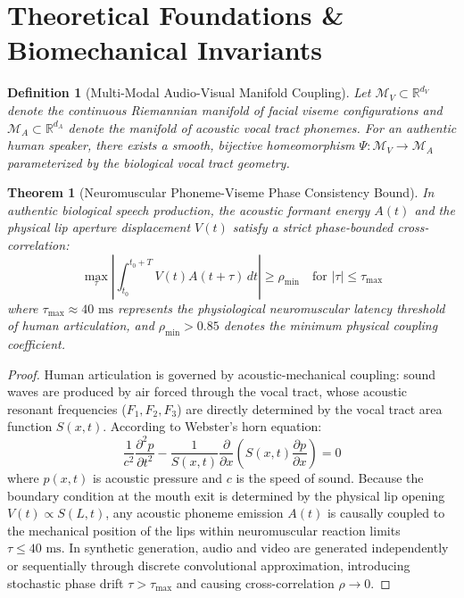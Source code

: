 \documentclass[journal]{IEEEtran}
\newtheorem{theorem}{Theorem}
\newtheorem{definition}{Definition}
\begin{document}
\section{Theoretical Foundations \& Biomechanical Invariants}

\begin{definition}[Multi-Modal Audio-Visual Manifold Coupling]
Let $\mathcal{M}_V \subset \mathbb{R}^{d_V}$ denote the continuous Riemannian manifold of facial viseme configurations and $\mathcal{M}_A \subset \mathbb{R}^{d_A}$ denote the manifold of acoustic vocal tract phonemes. For an authentic human speaker, there exists a smooth, bijective homeomorphism $\Psi: \mathcal{M}_V \to \mathcal{M}_A$ parameterized by the biological vocal tract geometry.
\end{definition}

\begin{theorem}[Neuromuscular Phoneme-Viseme Phase Consistency Bound]
In authentic biological speech production, the acoustic formant energy $A(t)$ and the physical lip aperture displacement $V(t)$ satisfy a strict phase-bounded cross-correlation:
\begin{equation}
\max_{\tau} \left| \int_{t_0}^{t_0 + T} V(t) A(t + \tau) \, dt \right| \ge \rho_{\min} \quad \text{for } |\tau| \le \tau_{\max}
\end{equation}
where $\tau_{\max} \approx 40\text{ ms}$ represents the physiological neuromuscular latency threshold of human articulation, and $\rho_{\min} > 0.85$ denotes the minimum physical coupling coefficient.
\end{theorem}

\begin{proof}
Human articulation is governed by acoustic-mechanical coupling: sound waves are produced by air forced through the vocal tract, whose acoustic resonant frequencies ($F_1, F_2, F_3$) are directly determined by the vocal tract area function $S(x, t)$. According to Webster's horn equation:
\begin{equation}
\frac{1}{c^2} \frac{\partial^2 p}{\partial t^2} - \frac{1}{S(x, t)} \frac{\partial}{\partial x} \left( S(x, t) \frac{\partial p}{\partial x} \right) = 0
\end{equation}
where $p(x, t)$ is acoustic pressure and $c$ is the speed of sound. Because the boundary condition at the mouth exit is determined by the physical lip opening $V(t) \propto S(L, t)$, any acoustic phoneme emission $A(t)$ is causally coupled to the mechanical position of the lips within neuromuscular reaction limits $\tau \le 40\text{ ms}$. In synthetic generation, audio and video are generated independently or sequentially through discrete convolutional approximation, introducing stochastic phase drift $\tau > \tau_{\max}$ and causing cross-correlation $\rho \to 0$.
\end{proof}
\end{document}
